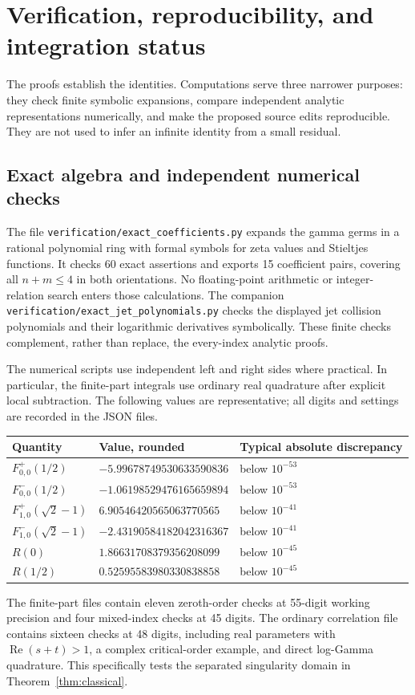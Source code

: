 \documentclass[11pt]{article}
\numberwithin{equation}{section}
\theoremstyle{definition}\newtheorem{definition}[theorem]{Definition}
\theoremstyle{remark}\newtheorem{remark}[theorem]{Remark}
\DeclareMathOperator{\Rea}{Re}
\newcommand{\sourcepath}[1]{\texttt{\small\nolinkurl{#1}}}
\begin{document}
\section{Verification, reproducibility, and integration status}
\label{sec:verification}

The proofs establish the identities. Computations serve three narrower
purposes: they check finite symbolic expansions, compare independent
analytic representations numerically, and make the proposed source
edits reproducible. They are not used to infer an infinite identity from
a small residual.

\subsection{Exact algebra and independent numerical checks}

The file \sourcepath{verification/exact_coefficients.py} expands the
gamma germs in a rational polynomial ring with formal symbols for zeta
values and Stieltjes functions. It checks 60 exact assertions and exports
15 coefficient pairs, covering all $n+m\le4$ in both orientations.
No floating-point arithmetic or integer-relation search enters those
calculations. The companion
\sourcepath{verification/exact_jet_polynomials.py} checks the displayed
jet collision polynomials and their logarithmic derivatives symbolically.
These finite checks complement, rather than replace, the every-index
analytic proofs.

The numerical scripts use independent left and right sides where
practical. In particular, the finite-part integrals use ordinary real
quadrature after explicit local subtraction. The following values are
representative; all digits and settings are recorded in the JSON files.
\begin{center}
\small
\begin{tabular}{@{}lll@{}}
\toprule
Quantity & Value, rounded & Typical absolute discrepancy\\
\midrule
$F^+_{0,0}(1/2)$ & $-5.99678749530633590836$ & below $10^{-53}$\\
$F^-_{0,0}(1/2)$ & $-1.06198529476165659894$ & below $10^{-53}$\\
$F^+_{1,0}(\sqrt2-1)$ & $6.90546420565063770565$ & below $10^{-41}$\\
$F^-_{1,0}(\sqrt2-1)$ & $-2.43190584182042316367$ & below $10^{-41}$\\
$R(0)$ & $1.86631708379356208099$ & below $10^{-45}$\\
$R(1/2)$ & $0.52595583980330838858$ & below $10^{-45}$\\
\bottomrule
\end{tabular}
\end{center}
The finite-part files contain eleven zeroth-order checks at 55-digit
working precision and four mixed-index checks at 45 digits. The ordinary
correlation file contains sixteen checks at 48 digits, including real
parameters with $\Rea(s+t)>1$, a complex critical-order example, and
direct log-Gamma quadrature. This specifically tests the separated
singularity domain in Theorem~\ref{thm:classical}.
\end{document}
